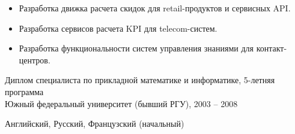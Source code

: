 \begin{itemize}[leftmargin=1.3em, itemsep=0.2em]
  \item Разработка движка расчета скидок для retail-продуктов и сервисных API.
  \item Разработка сервисов расчета KPI для telecom-систем.
  \item Разработка функциональности систем управления знаниями для контакт-центров.
\end{itemize}


Диплом специалиста по прикладной математике и информатике, 5-летняя программа\\
Южный федеральный университет (бывший РГУ), 2003 -- 2008

Английский, Русский, Французский (начальный)
